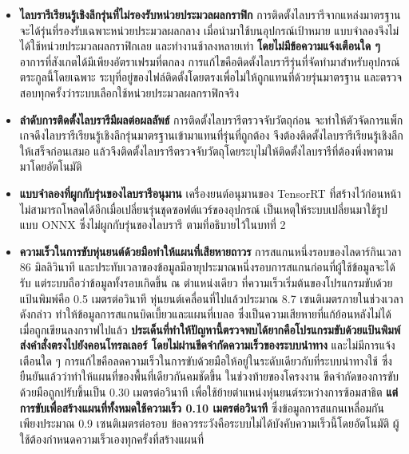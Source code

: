 \documentclass[a4paper,12pt]{report}
\begin{document}
\begin{itemize}[leftmargin=1.25cm, itemsep=6pt, topsep=6pt]
    \item \textbf{ไลบรารีเรียนรู้เชิงลึกรุ่นที่ไม่รองรับหน่วยประมวลผลกราฟิก}
    การติดตั้งไลบรารีจากแหล่งมาตรฐานจะได้รุ่นที่รองรับเฉพาะหน่วยประมวลผลกลาง
    เมื่อนำมาใช้บนอุปกรณ์เป้าหมาย แบบจำลองจึงไม่ได้ใช้หน่วยประมวลผลกราฟิกเลย
    และทำงานช้าลงหลายเท่า \textbf{โดยไม่มีข้อความแจ้งเตือนใด ๆ}
    อาการที่สังเกตได้มีเพียงอัตราเฟรมที่ตกลง
    การแก้ไขคือติดตั้งไลบรารีรุ่นที่จัดทำมาสำหรับอุปกรณ์ตระกูลนี้โดยเฉพาะ
    ระบุที่อยู่ของไฟล์ติดตั้งโดยตรงเพื่อไม่ให้ถูกแทนที่ด้วยรุ่นมาตรฐาน
    และตรวจสอบทุกครั้งว่าระบบเลือกใช้หน่วยประมวลผลกราฟิกจริง

    \item \textbf{ลำดับการติดตั้งไลบรารีมีผลต่อผลลัพธ์} การติดตั้งไลบรารีตรวจจับวัตถุก่อน
    จะทำให้ตัวจัดการแพ็กเกจดึงไลบรารีเรียนรู้เชิงลึกรุ่นมาตรฐานเข้ามาแทนที่รุ่นที่ถูกต้อง
    จึงต้องติดตั้งไลบรารีเรียนรู้เชิงลึกให้เสร็จก่อนเสมอ
    แล้วจึงติดตั้งไลบรารีตรวจจับวัตถุโดยระบุไม่ให้ติดตั้งไลบรารีที่ต้องพึ่งพาตามมาโดยอัตโนมัติ

    \item \textbf{แบบจำลองที่ผูกกับรุ่นของไลบรารีอนุมาน} เครื่องยนต์อนุมานของ TensorRT
    ที่สร้างไว้ก่อนหน้าไม่สามารถโหลดได้อีกเมื่อเปลี่ยนรุ่นชุดซอฟต์แวร์ของอุปกรณ์
    เป็นเหตุให้ระบบเปลี่ยนมาใช้รูปแบบ ONNX ซึ่งไม่ผูกกับรุ่นของไลบรารี
    ตามที่อธิบายไว้ในบทที่ 2

    \item \textbf{ความเร็วในการขับหุ่นยนต์ด้วยมือทำให้แผนที่เสียหายถาวร}
    การสแกนหนึ่งรอบของไลดาร์กินเวลา 86 มิลลิวินาที
    และประทับเวลาของข้อมูลมีอายุประมาณหนึ่งรอบการสแกนก่อนที่ผู้ใช้ข้อมูลจะได้รับ
    แต่ระบบถือว่าข้อมูลทั้งรอบเกิดขึ้น ณ ตำแหน่งเดียว
    ที่ความเร็วเริ่มต้นของโปรแกรมขับด้วยแป้นพิมพ์คือ 0.5 เมตรต่อวินาที
    หุ่นยนต์เคลื่อนที่ไปแล้วประมาณ 8.7 เซนติเมตรภายในช่วงเวลาดังกล่าว
    ทำให้ข้อมูลการสแกนบิดเบี้ยวและแผนที่เบลอ
    ซึ่งเป็นความเสียหายที่แก้ย้อนหลังไม่ได้เมื่อถูกเขียนลงกราฟไปแล้ว
    \textbf{ประเด็นที่ทำให้ปัญหานี้ตรวจพบได้ยากคือโปรแกรมขับด้วยแป้นพิมพ์ส่งคำสั่งตรงไปยังคอนโทรลเลอร์
    โดยไม่ผ่านขีดจำกัดความเร็วของระบบนำทาง} และไม่มีการแจ้งเตือนใด ๆ
    การแก้ไขคือลดความเร็วในการขับด้วยมือให้อยู่ในระดับเดียวกับที่ระบบนำทางใช้
    ซึ่งยืนยันแล้วว่าทำให้แผนที่ของพื้นที่เดียวกันคมชัดขึ้น
    ในช่วงท้ายของโครงงาน ขีดจำกัดของการขับด้วยมือถูกปรับขึ้นเป็น 0.30 เมตรต่อวินาที
    เพื่อใช้ย้ายตำแหน่งหุ่นยนต์ระหว่างการซ้อมสาธิต
    \textbf{แต่การขับเพื่อสร้างแผนที่ทั้งหมดใช้ความเร็ว 0.10 เมตรต่อวินาที}
    ซึ่งข้อมูลการสแกนเหลื่อมกันเพียงประมาณ 0.9 เซนติเมตรต่อรอบ
    ข้อควรระวังคือระบบไม่ได้บังคับความเร็วนี้โดยอัตโนมัติ
    ผู้ใช้ต้องกำหนดความเร็วเองทุกครั้งที่สร้างแผนที่



\end{itemize}
\end{document}
